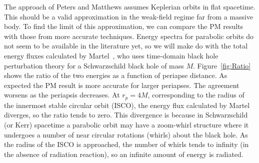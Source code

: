 \documentclass[aps,prd,amsfonts,amssymb,amsmath,nofootinbib,floatfix,reprint,showpacs,groupedaddress]{revtex4-1}
\newcommand{\Figref}[1]{Figure~\ref{fig:#1}}
\begin{document}
The approach of Peters and Matthews assumes Keplerian orbits in flat spacetime. This should be a valid approximation in the weak-field regime far from a massive body. To find the limit of this approximation, we can compare the PM results with those from more accurate techniques. Energy spectra for parabolic orbits do not seem to be available in the literature yet, so we will make do with the total energy fluxes calculated by Martel~\cite{Martel2004a}, who uses time-domain black hole perturbation theory for a Schwarzschild black hole of mass $M$. \Figref{Ratio} shows the ratio of the two energies as a function of periapse distance. As expected the PM result is more accurate for larger periapses. The agreement worsens as the periapsis decreases. At $r_{p} = 4 M$, corresponding to the radius of the innermost stable circular orbit (ISCO), the energy flux calculated by Martel diverges, so the ratio tends to zero. This divergence is because in Schwarzschild (or Kerr) spacetime a parabolic orbit may have a zoom-whirl structure where it undergoes a number of near circular rotations (whirls) about the black hole. As the radius of the ISCO is approached, the number of whirls tends to infinity (in the absence of radiation reaction), so an infinite amount of energy is radiated.
\end{document}
